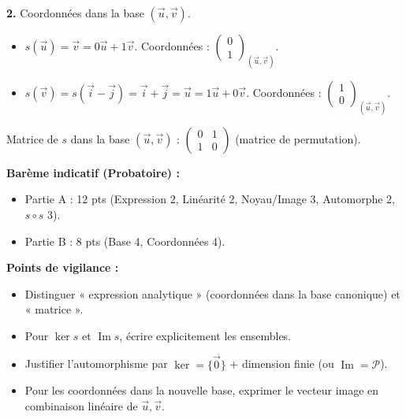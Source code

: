 \documentclass[11pt]{article}
\begin{document}
\begin{corrige}
\textbf{2.} Coordonnées dans la base $(\vec{u},\vec{v})$.
\begin{itemize}
    \item $s(\vec{u}) = \vec{v} = 0\vec{u} + 1\vec{v}$. Coordonnées : $\boxed{\begin{pmatrix} 0 \\ 1 \end{pmatrix}_{(\vec{u},\vec{v})}}$.
    \item $s(\vec{v}) = s(\vec{i}-\vec{j}) = \vec{i}+\vec{j} = \vec{u} = 1\vec{u} + 0\vec{v}$. Coordonnées : $\boxed{\begin{pmatrix} 1 \\ 0 \end{pmatrix}_{(\vec{u},\vec{v})}}$.
\end{itemize}
Matrice de $s$ dans la base $(\vec{u},\vec{v})$ : $\begin{pmatrix} 0 & 1 \\ 1 & 0 \end{pmatrix}$ (matrice de permutation).

\vspace{0.5em}
\noindent\textbf{Barème indicatif (Probatoire) :}
\begin{itemize}
    \item Partie A : 12 pts (Expression 2, Linéarité 2, Noyau/Image 3, Automorphe 2, $s\circ s$ 3).
    \item Partie B : 8 pts (Base 4, Coordonnées 4).
\end{itemize}
\noindent\textbf{Points de vigilance :}
\begin{itemize}
    \item Distinguer « expression analytique » (coordonnées dans la base canonique) et « matrice ».
    \item Pour $\ker s$ et $\operatorname{Im} s$, écrire explicitement les ensembles.
    \item Justifier l'automorphisme par $\ker=\{\vec{0}\}$ + dimension finie (ou $\operatorname{Im}=\mathcal{P}$).
    \item Pour les coordonnées dans la nouvelle base, exprimer le vecteur image en combinaison linéaire de $\vec{u},\vec{v}$.
\end{itemize}
\end{corrige}
\end{document}
